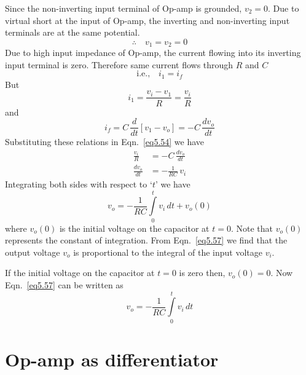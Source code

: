 Since the non-inverting input terminal of Op-amp is grounded, $v_{2}=0$. Due to virtual short at the input of Op-amp, the inverting and non-inverting input terminals are at the same potential.
$$
\therefore\quad v_{1}=v_{2}=0
$$
Due to high input impedance of Op-amp, the current flowing into its inverting input terminal is zero. Therefore same current flows through $R$ and $C$
\begin{equation}
\text{i.e.,}\quad i_{1}=i_{f}\label{eq5.54}
\end{equation}
But
\begin{equation}
i_{1}=\frac{v_{i}-v_{1}}{R}=\frac{v_{i}}{R}\label{eq5.55}
\end{equation}
and
\begin{equation}
i_{f}=C\,\frac{d}{dt}[v_{1}-v_{o}]=-C\,\dfrac{dv_{o}}{dt}\label{eq5.56}
\end{equation}
Substituting these relations in Eqn.~\eqref{eq5.54} we have
\begin{align*}
\frac{v_{i}}{R} &=-C\,\frac{dv_{o}}{dt}\\[3pt]
\frac{dv_{o}}{dt} &= -\frac{1}{RC}\,v_{i}
\end{align*}
Integrating both sides with respect to `$t$' we have
\begin{equation}
v_{o}=-\frac{1}{RC}\int\limits^{t}_{0}v_{i}\,dt+v_{o}(0)\label{eq5.57}
\end{equation}
where $v_{o}(0)$ is the initial voltage on the capacitor at $t=0$. Note that $v_{o}(0)$ represents the constant of integration. From Eqn.~\eqref{eq5.57} we find that the output voltage $v_{o}$ is proportional to the integral of the input voltage $v_{i}$.

If the initial voltage on the capacitor at $t=0$ is zero then, $v_{o}(0)=0$. Now Eqn.~\eqref{eq5.57} can be written as
\begin{equation}
v_{o}=-\frac{1}{RC}\int\limits^{t}_{0}v_{i}\,dt\label{eq5.58}
\end{equation}

\section{Op-amp as differentiator}\label{sec5.17}

